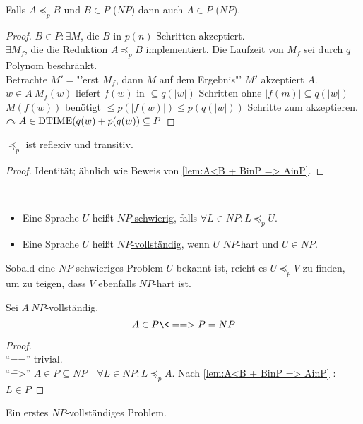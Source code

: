 \begin{lemma}\label{lem:A<B + BinP => AinP}
	Falls $A\preceq_p B$ und $B\in P$ ($NP$) dann auch $A\in P$ ($NP$).
\end{lemma}
\begin{proof}
	$B\in P: \exists M$, die $B$ in $p(n)$ Schritten akzeptiert.\\
	$\exists M_f$, die die Reduktion $A\preceq_p B$ implementiert. Die Laufzeit von $M_f$ sei durch $q$ Polynom beschränkt.\\
	Betrachte $M'=$"'erst $M_f$, dann $M$ auf dem Ergebnis"'
	$M'$ akzeptiert $A$.\\
	$w\in A\ M_f(w)$ liefert $f(w)$ in $\subseteq q(|w|)$ Schritten ohne $|f(m)|\subseteq q(|w|)$\\
	$M(f(w))$ benötigt $\leq p(|f(w)|)\leq p(q(|w|))$ Schritte zum akzeptieren.\\
	$\curvearrowright A\in \operatorname{DTIME}(q(w)+p(q(w))\subseteq P$
\end{proof}
\begin{lemma}[name={[$\preceq_p$ ist reflexiv und transitiv]}]
	$\preceq_p$ ist reflexiv und transitiv.
\end{lemma}
\begin{proof}
	Identität; ähnlich wie Beweis von \autoref{lem:A<B + BinP => AinP}.
\end{proof}


\begin{Def}[name={[$NP$-schwer und $NP$-vollständig]}]\
	\begin{itemize}
	\item Eine Sprache $U$ heißt \underline{$NP$-schwierig}, falls $\forall L\in NP : L\preceq_p U$.
	\item Eine Sprache $U$ heißt \underline{$NP$-vollständig}, wenn $U$ $NP$-hart und $U\in NP$. \qedhere
	\end{itemize}
\end{Def}
\begin{Bem}
	Sobald eine $NP$-schwieriges Problem $U$ bekannt ist, reicht es $U\preceq_p V$ zu finden, um zu teigen, dass $V$ ebenfalls $NP$-hart ist.
\end{Bem}
\begin{Satz}
	Sei $A\ NP$-vollständig.
	\[ A\in P \<==> P=NP \]
\end{Satz}
\begin{proof}\ \\
	"`\<=="' trivial.\\
	"`\==>"' $A\in P\subseteq NP\quad \forall L\in NP: L\preceq_p A$. Nach \autoref{lem:A<B + BinP => AinP} : $L\in P$
\end{proof}
Ein erstes $NP$-vollständiges Problem.

